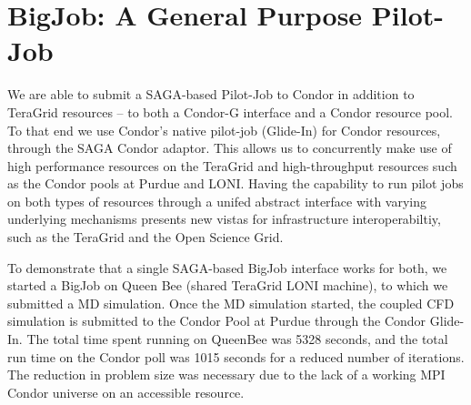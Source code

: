 \documentclass[conference,final]{IEEEtran}
\begin{document}
\section{BigJob: A General Purpose Pilot-Job}

We are able to submit a SAGA-based Pilot-Job to Condor in addition to TeraGrid resources -- to both a Condor-G interface and a Condor resource pool. To that end we use Condor's native pilot-job (Glide-In) for Condor resources, through the SAGA Condor adaptor. This allows us to concurrently make use of high performance resources on the TeraGrid and high-throughput resources such as the Condor pools at Purdue and LONI. Having the capability to run pilot jobs on both types of resources through a unifed abstract interface with varying underlying mechanisms presents new vistas for infrastructure interoperabiltiy, such as the TeraGrid and the Open Science Grid.

To demonstrate that a single SAGA-based BigJob interface works for both, we started a BigJob on Queen Bee (shared TeraGrid LONI machine), to which we submitted a MD simulation. Once the MD simulation started, the coupled CFD simulation is submitted to the Condor Pool at Purdue through the Condor Glide-In. The total time spent running on QueenBee was 5328 seconds, and the total run time on the Condor poll was 1015 seconds for a reduced number of iterations. The reduction in problem size was necessary due to the lack of a working MPI Condor universe on an accessible resource.
\end{document}

